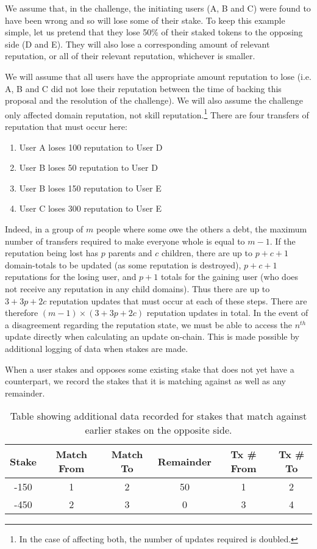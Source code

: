 We assume that, in the challenge, the initiating users (A, B and C) were found to have been wrong and so will lose some of their stake. To keep this example simple, let us pretend that they lose 50\% of their staked tokens to the opposing side (D and E). They will also lose a corresponding amount of relevant reputation, or all of their relevant reputation, whichever is smaller.

We will assume that all users have the appropriate amount reputation to lose (i.e. A, B and C did not lose their reputation between the time of backing this proposal and the resolution of the challenge). We will also assume the challenge only affected domain reputation, not skill reputation.\footnote{In the case of affecting both, the number of updates required is doubled.} There are four transfers of reputation that must occur here:

\begin{enumerate}
\item User A loses 100 reputation to User D
\item User B loses 50 reputation to User D
\item User B loses 150 reputation to User E
\item User C loses 300 reputation to User E
\end{enumerate}

Indeed, in a group of $m$ people where some owe the others a debt, the maximum number of transfers required to make everyone whole is equal to $m-1$. If the reputation being lost has $p$ parents and $c$ children, there are up to $p+c+1$ domain-totals to be updated (as some reputation is destroyed), $p+c+1$ reputations for the losing user, and $p+1$ totals for the gaining user (who does not receive any reputation in any child domains). Thus there are up to $3+3p+2c$ reputation updates that must occur at each of these steps. There are therefore $(m-1)\times(3+3p+2c)$ reputation updates in total. In the event of a disagreement regarding the reputation state, we must be able to access the $n^{th}$ update directly when calculating an update on-chain. This is made possible by additional logging of data when stakes are made.

When a user stakes and opposes some existing stake that does not yet have a counterpart, we record the stakes that it is matching against as well as any remainder.

\begin{table}[ht]
\centering
\caption{Table showing additional data recorded for stakes that match against earlier stakes on the opposite side.}
\begin{tabular}{|c|c|c|c|c|c|}
\hline
Stake & Match From & Match To & Remainder & Tx \# From & Tx \# To\\ \hline
-150  & 1          & 2        & 50      & 1 & 2 \\ \hline
-450  & 2          & 3        & 0       &  3 & 4 \\ \hline
\end{tabular}
\end{table}

